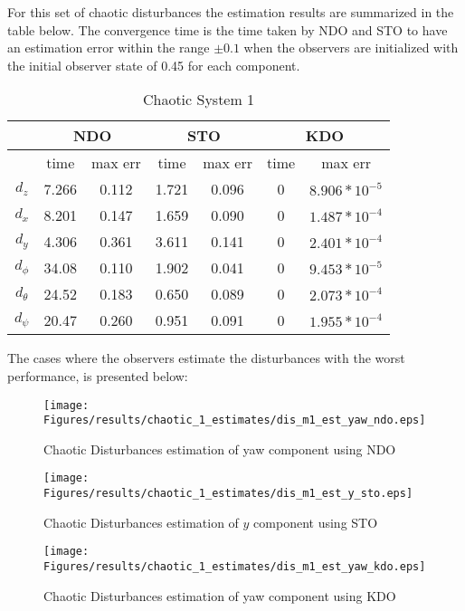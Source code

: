\documentclass{article}
\begin{document}
For this set of chaotic disturbances the estimation results are summarized in the table below. The convergence time is the time taken by NDO and STO to have an estimation error within the range $\pm0.1$ when the observers are initialized with the initial observer state of 0.45 for each component. 



\begin{table}[!htbp]
\centering
\caption{Chaotic System 1}
\begin{tabular}{*7c}
\toprule
{}  &  \multicolumn{2}{c}{NDO} & \multicolumn{2}{c}{STO} & \multicolumn{2}{c}{KDO}\\
\midrule
{}        &   time & max err  & time  &max err& time  & max err\\
$d_z$     &  7.266 & 0.112   & 1.721  & 0.096 & 0     & $8.906*10^{-5}$\\
$d_x$     &  8.201 & 0.147   & 1.659  & 0.090 & 0     & $1.487*10^{-4}$\\
$d_y$     &  4.306 & 0.361   & 3.611  & 0.141 & 0     & $2.401*10^{-4}$\\
$d_\phi$  &  34.08 & 0.110   & 1.902  & 0.041 & 0     & $9.453*10^{-5}$\\
$d_\theta$&  24.52 & 0.183   & 0.650  & 0.089 & 0     & $2.073*10^{-4}$\\
$d_\psi$  &  20.47 & 0.260   & 0.951  & 0.091 & 0     & $1.955*10^{-4}$\\

\bottomrule
\end{tabular}
\end{table}

The cases where the observers estimate the disturbances with the worst performance, is presented below:

\begin{figure}[H]
\centering
\texttt{[image: Figures/results/chaotic\_1\_estimates/dis\_m1\_est\_yaw\_ndo.eps]}
\caption{Chaotic Disturbances estimation of yaw component using NDO}
\label{dis_m1_est_yaw_ndo}
\end{figure}

\begin{figure}[H]
\centering
\texttt{[image: Figures/results/chaotic\_1\_estimates/dis\_m1\_est\_y\_sto.eps]}
\caption{Chaotic Disturbances estimation of $y$ component using STO}
\label{dis_m1_est_y_sto}
\end{figure}

\begin{figure}[H]
\centering
\texttt{[image: Figures/results/chaotic\_1\_estimates/dis\_m1\_est\_yaw\_kdo.eps]}
\caption{Chaotic Disturbances estimation of yaw component using KDO}
\label{dis_m1_est_yaw_kdo}
\end{figure}
\end{document}
